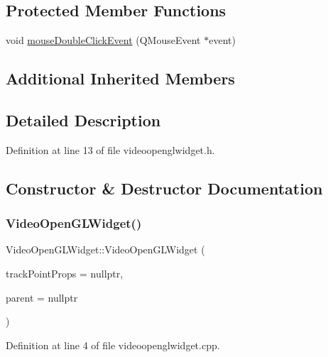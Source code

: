 \subsection*{Protected Member Functions}
\begin{DoxyCompactItemize}
\item 
void \mbox{\hyperlink{class_video_open_g_l_widget_a9e5408623580fdca84a7f1553f4807c6}{mouse\+Double\+Click\+Event}} (Q\+Mouse\+Event $\ast$event)
\end{DoxyCompactItemize}
\subsection*{Additional Inherited Members}


\subsection{Detailed Description}


Definition at line 13 of file videoopenglwidget.\+h.



\subsection{Constructor \& Destructor Documentation}
\mbox{\label{class_video_open_g_l_widget_acd18162e70ad5cb55fc5ad53c590651b}} 
\subsubsection{\texorpdfstring{VideoOpenGLWidget()}{VideoOpenGLWidget()}}
{\footnotesize\ttfamily Video\+Open\+G\+L\+Widget\+::\+Video\+Open\+G\+L\+Widget (\begin{DoxyParamCaption}\item[{\mbox{\hyperlink{struct_track_point_property}{Track\+Point\+Property}} $\ast$}]{track\+Point\+Props = {\ttfamily nullptr},  }\item[{Q\+Widget $\ast$}]{parent = {\ttfamily nullptr} }\end{DoxyParamCaption})}



Definition at line 4 of file videoopenglwidget.\+cpp.



